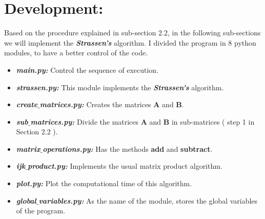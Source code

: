 \section{Development:}

Based on the procedure explained in sub-section 2.2, in the following sub-sections we will implement the {\bfseries\itshape Strassen's} algorithm. I divided the program in 8 python modules, to have a better control of the code.

\begin{itemize}
\item {\bfseries\itshape main.py:} Control the sequence of execution.
\item {\bfseries\itshape strassen.py:} This module implements the {\bfseries\itshape Strassen's} algorithm.
\item {\bfseries\itshape create$\_$matrices.py:} Creates the matrices {\bfseries A} and {\bfseries B}.
\item {\bfseries\itshape sub$\_$matrices.py:} Divide the matrices {\bfseries A} and {\bfseries B} in sub-matrices ( step 1 in Section 2.2 ).
\item {\bfseries\itshape matrix$\_$operations.py:} Has the methods {\bfseries add} and {\bfseries subtract}.
\item {\bfseries\itshape ijk$\_$product.py:} Implements the usual matrix product algorithm.
\item {\bfseries\itshape plot.py:} Plot the computational time of this algorithm.
\item {\bfseries\itshape global$\_$variables.py:} As the name of the module, stores the global variables of the program.
\end{itemize}

{\bfseries\itshape\color{carmine}{Observation:}} {\itshape\color{carmine}{The code that we will show bellow doesn't include the counter in each line of the algorithm, this because to make notice only the essential parts.}}
